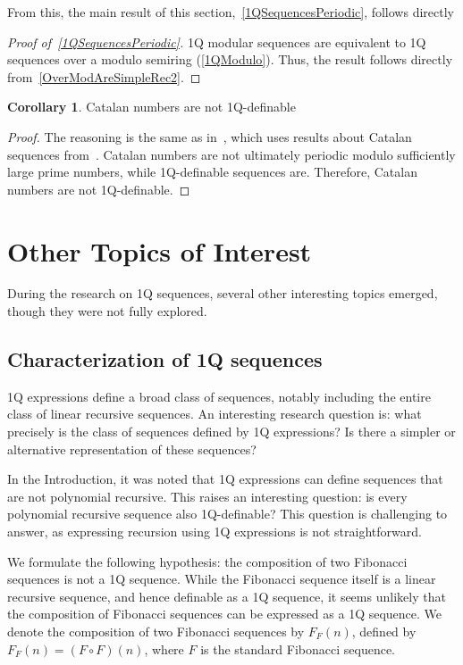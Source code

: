 \documentclass[en]{pracamgr}
\theoremstyle{definition}
\newtheorem{corollary}{Corollary}[section]
\begin{document}
From this, the main result of this section,~\cref{1QSequencesPeriodic}, follows directly

\begin{proof}[Proof of~\cref{1QSequencesPeriodic}]
    1Q modular sequences are equivalent to 1Q sequences over a modulo semiring (\cref{1QModulo}). Thus, the result follows directly from~\cref{OverModAreSimpleRec2}.
\end{proof}

\begin{corollary}
    Catalan numbers are not 1Q-definable
\end{corollary}

\begin{proof}
    The reasoning is the same as in~\cite[Theorem 7, Corollary 8]{CadilhacMPPS20}, which uses results about Catalan sequences from~\cite{KubotaCatalan}. Catalan numbers are not ultimately periodic modulo sufficiently large prime numbers, while 1Q-definable sequences are. Therefore, Catalan numbers are not 1Q-definable.
\end{proof}

\chapter{Other Topics of Interest}
\label{SecOther}
During the research on 1Q sequences, several other interesting topics emerged, though they were not fully explored.

\section{Characterization of 1Q sequences}
\label{CharacterizationOf1QSequences}
1Q expressions define a broad class of sequences, notably including the entire class of linear recursive sequences. An interesting research question is: what precisely is the class of sequences defined by 1Q expressions? Is there a simpler or alternative representation of these sequences?

In the Introduction, it was noted that 1Q expressions can define sequences that are not polynomial recursive. This raises an interesting question: is every polynomial recursive sequence also 1Q-definable? This question is challenging to answer, as expressing recursion using 1Q expressions is not straightforward.

We formulate the following hypothesis: the composition of two Fibonacci sequences is not a 1Q sequence. While the Fibonacci sequence itself is a linear recursive sequence, and hence definable as a 1Q sequence, it seems unlikely that the composition of Fibonacci sequences can be expressed as a 1Q sequence. We denote the composition of two Fibonacci sequences by $F_F (n)$, defined by $F_F (n) = (F \circ F) (n)$, where $F$ is the standard Fibonacci sequence.
\end{document}
